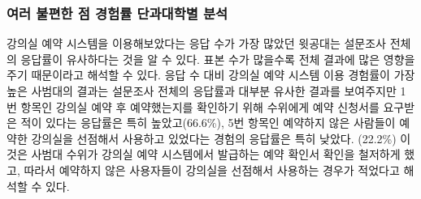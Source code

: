\documentclass[11pt,a4paper]{article}
\begin{document}
\subsubsection{여러 불편한 점 경험률 단과대학별 분석}
강의실 예약 시스템을 이용해보았다는 응답 수가 가장 많았던 윗공대는 설문조사
전체의 응답률이 유사하다는 것을 알 수 있다. 표본 수가 많을수록 전체 결과에 많은
영향을 주기 때문이라고 해석할 수 있다. 응답 수 대비 강의실 예약 시스템 이용
경험률이 가장 높은 사범대의 결과는 설문조사 전체의 응답률과 대부분 유사한
결과를 보여주지만 1번 항목인 강의실 예약 후 예약했는지를 확인하기 위해 수위에게
예약 신청서를 요구받은 적이 있다는 응답률은 특히 높았고(66.6\%), 5번 항목인
예약하지 않은 사람들이 예약한 강의실을 선점해서 사용하고 있었다는 경험의
응답률은 특히 낮았다. (22.2\%) 이것은 사범대 수위가 강의실 예약 시스템에서
발급하는 예약 확인서 확인을 철저하게 했고, 따라서 예약하지 않은 사용자들이
강의실을 선점해서 사용하는 경우가 적었다고 해석할 수 있다.
\end{document}
